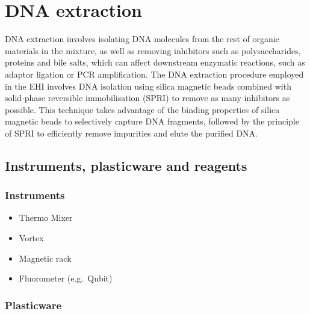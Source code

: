 \documentclass[
]{book}
\providecommand{\tightlist}{%
  \setlength{\itemsep}{0pt}\setlength{\parskip}{0pt}}
\begin{document}
\hypertarget{dna-extraction}{%
\chapter{DNA extraction}\label{dna-extraction}}

DNA extraction involves isolating DNA molecules from the rest of organic materials in the mixture, as well as removing inhibitors such as polysaccharides, proteins and bile salts, which can affect downstream enzymatic reactions, such as adaptor ligation or PCR amplification. The DNA extraction procedure employed in the EHI involves DNA isolation using silica magnetic beads combined with solid-phase reversible immobilisation (SPRI) to remove as many inhibitors as possible. This technique takes advantage of the binding properties of silica magnetic beads to selectively capture DNA fragments, followed by the principle of SPRI to efficiently remove impurities and elute the purified DNA.

\hypertarget{instruments-plasticware-and-reagents-1}{%
\section{Instruments, plasticware and reagents}\label{instruments-plasticware-and-reagents-1}}

\hypertarget{instruments-1}{%
\subsection*{Instruments}\label{instruments-1}}

\begin{itemize}
\tightlist
\item
  Thermo Mixer
\item
  Vortex
\item
  Magnetic rack
\item
  Fluorometer (e.g.~Qubit)
\end{itemize}

\hypertarget{plasticware-1}{%
\subsection*{Plasticware}\label{plasticware-1}}
\end{document}
